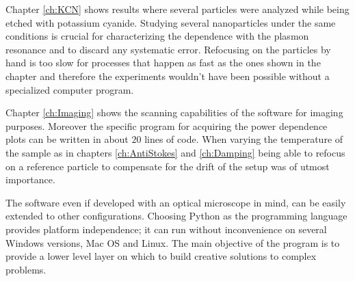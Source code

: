Chapter \ref{ch:KCN} shows results where several particles were analyzed while
being etched with potassium cyanide. Studying several nanoparticles under the
same conditions is crucial for characterizing the dependence with the plasmon
resonance and to discard any systematic error. Refocusing on the particles by
hand is too slow for processes that happen as fast as the ones shown in the
chapter and therefore the experiments wouldn't have been possible without a
specialized computer program. 

Chapter \ref{ch:Imaging} shows the scanning capabilities of the software for
imaging purposes. Moreover the specific program for acquiring the power
dependence plots can be written in about $20$ lines of code. When varying the
temperature of the sample as in chapters \ref{ch:AntiStokes} and
\ref{ch:Damping} being able to refocus on a reference particle to compensate for
the drift of the setup was of utmost importance.

The software even if developed with an optical microscope in mind, can be easily
extended to other configurations. Choosing Python as the programming language
provides platform independence; it can run without inconvenience on several
Windows versions, Mac OS and Linux. The main objective of the program is to
provide a lower level layer on which to build creative solutions to complex
problems.

